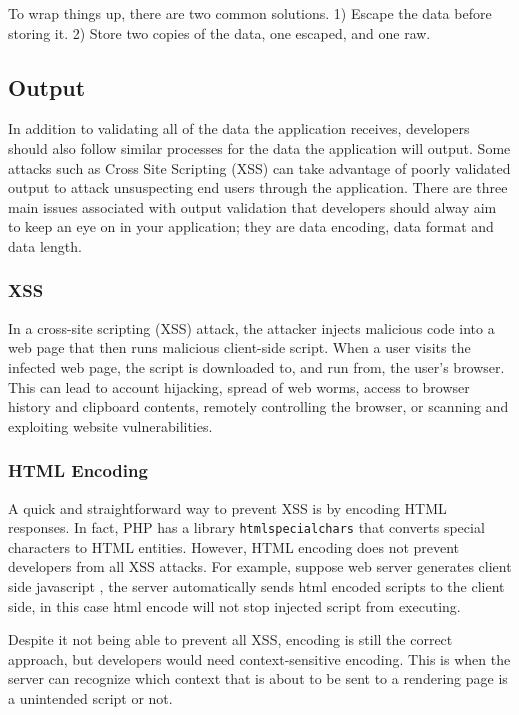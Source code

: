 \documentclass[conference]{IEEEtran}
\begin{document}
To wrap things up, there are two common solutions. 1) Escape the data before storing it. 2) Store two copies of the data, one escaped, and one raw.

\subsection{Output}
In addition to validating all of the data the application receives, developers should also follow similar processes for the data the application will output. Some attacks such as Cross Site Scripting (XSS) can take advantage of poorly validated output to attack unsuspecting end users through the application. There are three main issues associated with output validation that developers should alway aim to keep an eye on in your application; they are data encoding, data format and data length\cite{outputvalidation}.

\subsubsection{XSS}
In a cross-site scripting (XSS) attack, the attacker injects malicious code into a web page that then runs malicious client-side script. When a user visits the infected web page, the script is downloaded to, and run from, the user's browser. This can lead to account hijacking, spread of web worms, access to browser history and clipboard contents, remotely controlling the browser, or scanning and exploiting website vulnerabilities\cite{XSS}.

\subsubsection{HTML Encoding}
A quick and straightforward way to prevent XSS is by encoding HTML responses. In fact, PHP has a library \texttt{htmlspecialchars}\cite{htmlspecialchars} that converts special characters to HTML entities. However, HTML encoding does not prevent developers from all XSS attacks. For example, suppose web server generates client side javascript , the server automatically sends html encoded scripts to the client side, in this case html encode will not stop injected script from executing.

Despite it not being able to prevent all XSS, encoding is still the correct approach, but developers would need context-sensitive encoding\cite{contextencoding}. This is when the server can recognize which context that is about to be sent to a rendering page is a unintended script or not.
\end{document}

